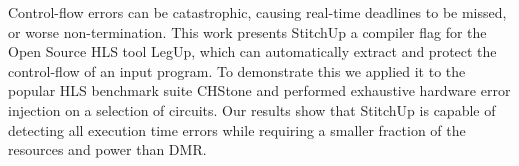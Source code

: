 Control-flow errors can be catastrophic, causing real-time deadlines to be missed, or worse non-termination.
This work presents StitchUp a compiler flag for the Open Source HLS tool LegUp, which can automatically extract and protect the control-flow of an input program.
To demonstrate this we applied it to the popular HLS benchmark suite CHStone and performed exhaustive hardware error injection on a selection of circuits.
Our results show that StitchUp is capable of detecting all execution time errors while requiring a smaller fraction of the resources and power than DMR.
